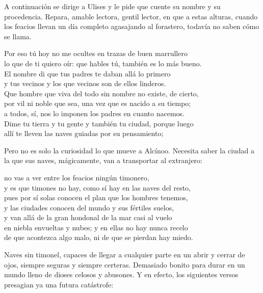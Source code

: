 A continuación se dirige a Ulises y le pide que cuente su nombre y su procedencia. Repara, amable lectora, gentil lector, en que a estas alturas, cuando los feacios llevan un día completo agasajando al forastero, todavía no saben cómo se llama.

\begin{versocita}
Por eso tú hoy no me ocultes en trazas de buen marrullero\\
lo que de ti quiero oír: que hables tú, también es lo más bueno.\\
El nombre di que tus padres te daban allá lo primero\\
y tus vecinos y los que vecinos son de ellos linderos.\\
Que hombre que viva del todo sin nombre no existe, de cierto,\\
por vil ni noble que sea, una vez que es nacido a su tiempo;\\
a todos, sí, nos lo imponen los padres en cuanto nacemos.\\
Dime tu tierra y tu gente y también tu ciudad, porque luego\\
allí te lleven las naves guiadas por su pensamiento;
\end{versocita}

Pero no es solo la curiosidad lo que mueve a Alcínoo. Necesita saber la ciudad a la que sus naves, mágicamente, van a transportar al extranjero:

\begin{versocita}
no vas a ver entre los feacios ningún timonero,\\
y es que timones no hay, como sí hay en las naves del resto,\\
pues por sí solas conocen el plan que los hombres tenemos,\\
y las ciudades conocen del mundo y sus fértiles suelos,\\
y van allá de la gran hondonal de la mar casi al vuelo\\
en niebla envueltas y nubes; y en ellas no hay nunca recelo\\
de que acontezca algo malo, ni de que se pierdan hay miedo.
\end{versocita}

Naves sin timonel, capaces de llegar a cualquier parte en un abrir y cerrar de ojos, siempre seguras y siempre certeras. Demasiado bonito para durar en un mundo lleno de dioses celosos y abusones. Y en efecto, los siguientes versos presagian ya una futura catástrofe:


